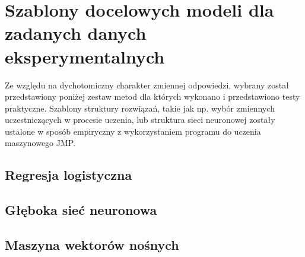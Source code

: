 	\newpage
	

\section{Szablony docelowych modeli dla zadanych danych eksperymentalnych}

Ze względu na dychotomiczny charakter zmiennej odpowiedzi, wybrany został przedstawiony poniżej zestaw metod dla których wykonano i przedstawiono testy praktyczne. Szablony struktury rozwiązań, takie jak np. wybór zmiennych uczestniczących w procesie uczenia, lub struktura sieci neuronowej zostały ustalone w sposób empiryczny z wykorzystaniem programu do uczenia maszynowego JMP. 

\subsection{Regresja logistyczna}

\subsection{Głęboka sieć neuronowa}

\subsection{Maszyna wektorów nośnych}